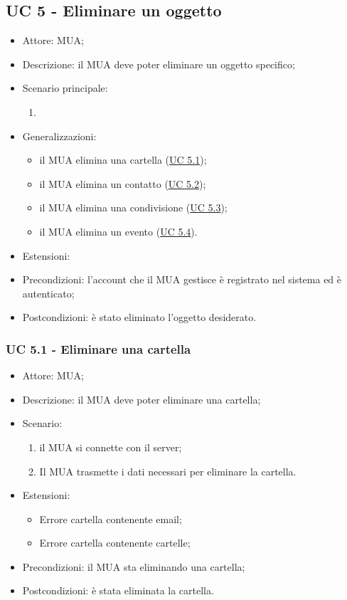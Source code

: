     \subsection{UC 5 - Eliminare un oggetto} \label{sec: UC 5}
    \begin{itemize}
        \item Attore: MUA;
        \item Descrizione: il MUA deve poter eliminare un oggetto specifico;
        \item Scenario principale:
        \begin{enumerate}
            \item 
        \end{enumerate}
        \item Generalizzazioni:
            \begin{itemize}
            \item il MUA elimina una cartella (\hyperref[sec: UC 5.1]{UC 5.1});
            \item il MUA elimina un contatto (\hyperref[sec: UC 5.2]{UC 5.2});
            \item il MUA elimina una condivisione (\hyperref[sec: UC 5.3]{UC 5.3});
            \item il MUA elimina un evento (\hyperref[sec: UC 5.4]{UC 5.4}).
            \end{itemize}
        \item Estensioni:
        \item Precondizioni: l’account che il MUA gestisce è registrato nel sistema ed è autenticato;
        \item Postcondizioni: è stato eliminato l’oggetto desiderato.
    \end{itemize}

    \subsubsection{UC 5.1 - Eliminare una cartella} \label{sec: UC 5.1}
    \begin{itemize}
        \item Attore: MUA;
        \item Descrizione: il MUA deve poter eliminare una cartella;
        \item Scenario:
        \begin{enumerate}
        \item il MUA si connette con il server;
        \item Il MUA trasmette i dati necessari per eliminare la cartella.
        \end{enumerate}
        \item Estensioni: 
            \begin{itemize}
                \item Errore cartella contenente email;
                \item Errore cartella contenente cartelle;
            \end{itemize}
        \item Precondizioni: il MUA sta eliminando una cartella;
        \item Postcondizioni: è stata eliminata la cartella.
    \end{itemize}

